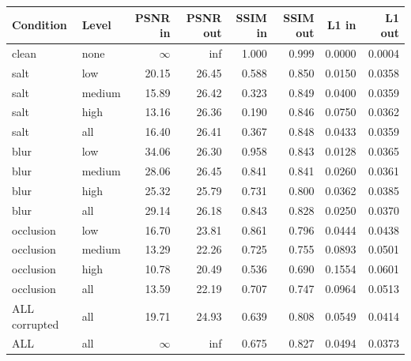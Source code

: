 \begin{tabular}{llrrrrrr}
\hline
Condition & Level & PSNR in & PSNR out & SSIM in & SSIM out & L1 in & L1 out \\
\hline
clean & none & $\infty$ & inf & 1.000 & 0.999 & 0.0000 & 0.0004 \\
salt & low & 20.15 & 26.45 & 0.588 & 0.850 & 0.0150 & 0.0358 \\
salt & medium & 15.89 & 26.42 & 0.323 & 0.849 & 0.0400 & 0.0359 \\
salt & high & 13.16 & 26.36 & 0.190 & 0.846 & 0.0750 & 0.0362 \\
salt & all & 16.40 & 26.41 & 0.367 & 0.848 & 0.0433 & 0.0359 \\
blur & low & 34.06 & 26.30 & 0.958 & 0.843 & 0.0128 & 0.0365 \\
blur & medium & 28.06 & 26.45 & 0.841 & 0.841 & 0.0260 & 0.0361 \\
blur & high & 25.32 & 25.79 & 0.731 & 0.800 & 0.0362 & 0.0385 \\
blur & all & 29.14 & 26.18 & 0.843 & 0.828 & 0.0250 & 0.0370 \\
occlusion & low & 16.70 & 23.81 & 0.861 & 0.796 & 0.0444 & 0.0438 \\
occlusion & medium & 13.29 & 22.26 & 0.725 & 0.755 & 0.0893 & 0.0501 \\
occlusion & high & 10.78 & 20.49 & 0.536 & 0.690 & 0.1554 & 0.0601 \\
occlusion & all & 13.59 & 22.19 & 0.707 & 0.747 & 0.0964 & 0.0513 \\
ALL corrupted & all & 19.71 & 24.93 & 0.639 & 0.808 & 0.0549 & 0.0414 \\
ALL & all & $\infty$ & inf & 0.675 & 0.827 & 0.0494 & 0.0373 \\
\hline
\end{tabular}
